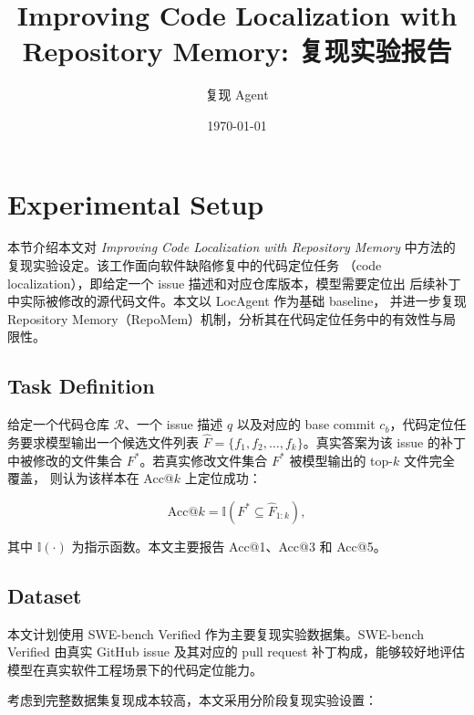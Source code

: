 \documentclass[11pt]{article}
\begin{document}
\title{Improving Code Localization with Repository Memory: 复现实验报告}
\author{复现 Agent}
\date{\today}

\maketitle

\tableofcontents

\newpage

\section{Experimental Setup}
\label{sec:experimental_setup}

本节介绍本文对 \textit{Improving Code Localization with Repository Memory}
中方法的复现实验设定。该工作面向软件缺陷修复中的代码定位任务
（code localization），即给定一个 issue 描述和对应仓库版本，模型需要定位出
后续补丁中实际被修改的源代码文件。本文以 LocAgent 作为基础 baseline，
并进一步复现 Repository Memory（RepoMem）机制，分析其在代码定位任务中的有效性与局限性。

\subsection{Task Definition}
\label{subsec:task_definition}

给定一个代码仓库 $\mathcal{R}$、一个 issue 描述 $q$ 以及对应的
base commit $c_b$，代码定位任务要求模型输出一个候选文件列表
$\hat{F} = \{f_1, f_2, \ldots, f_k\}$。真实答案为该 issue 的补丁中被修改的文件集合
$F^\ast$。若真实修改文件集合 $F^\ast$ 被模型输出的 top-$k$ 文件完全覆盖，
则认为该样本在 Acc@$k$ 上定位成功：

\begin{equation}
    \text{Acc@}k =
    \mathbb{I}(F^\ast \subseteq \hat{F}_{1:k}),
\end{equation}

其中 $\mathbb{I}(\cdot)$ 为指示函数。本文主要报告 Acc@1、Acc@3 和 Acc@5。

\subsection{Dataset}
\label{subsec:dataset}

本文计划使用 SWE-bench Verified 作为主要复现实验数据集。SWE-bench Verified
由真实 GitHub issue 及其对应的 pull request 补丁构成，能够较好地评估模型在真实软件工程场景下的代码定位能力。

考虑到完整数据集复现成本较高，本文采用分阶段复现实验设置：
\end{document}
